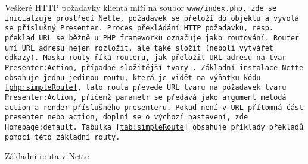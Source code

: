 \label{section:routovani}
Veškeré HTTP požadavky klienta míří na soubor \tt{www/index.php}, zde se inicialzuje prostředí Nette, požadavek se přeloží do objektu  a~vyvolá se příslušný Presenter. Proces překládání HTTP požadavků, resp. překlad URL se běžně u PHP frameworků označuje jako routování. Router umí URL adresu nejen rozložit, ale také složit (neboli vytvářet odkazy). Maska routy říká routeru, jak přeložit URL adresu na tvar \texttt{Presenter:Action}, případně složitější tvary \cite{NetteRoutovani}. Základní instalace Nette obsahuje jednu jedinou routu, která je vidět na výňatku kódu \ref{php:simpleRoute}, tato routa převede URL tvaru  na~požadavek tvaru \texttt{Presenter:Action}, přičemž parametr  se předává jako argument metodá action a render příslušného presenteru. Pokud není v URL přítomná část presenter nebo action, doplní se o výchozí nastavení, zde \texttt{Homepage:default}. Tabulka \ref{tab:simpleRoute} obsahuje příklady překladů pomocí této základní routy.
\clearpage
\begin{listing}[ht]
\caption{Základní routa v Nette}
\label{php:simpleRoute}
\end{listing}




